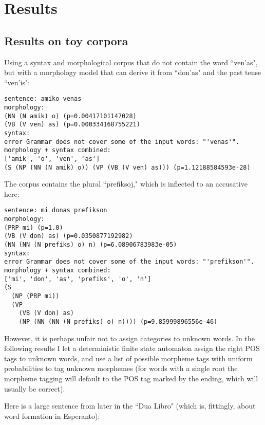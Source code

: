 \documentclass[10pt,a4paper]{article}
\begin{document}
\section{Results}
\subsection{Results on toy corpora}

Using a syntax and morphological corpus that do not contain the word ``ven'as",
but with a morphology model that can derive it from ``don'as" and the past
tense ``ven'is":

\begin{verbatim}
sentence: amiko venas
morphology:
(NN (N amik) o) (p=0.00417101147028)
(VB (V ven) as) (p=0.000334168755221)
syntax:
error Grammar does not cover some of the input words: "'venas'".
morphology + syntax combined:
['amik', 'o', 'ven', 'as']
(S (NP (NN (N amik) o)) (VP (VB (V ven) as))) (p=1.12188584593e-28)
\end{verbatim}

The corpus contains the plural ``prefiksoj," which is inflected to an accusative here:

\begin{verbatim}
sentence: mi donas prefikson
morphology:
(PRP mi) (p=1.0)
(VB (V don) as) (p=0.0350877192982)
(NN (NN (N prefiks) o) n) (p=6.08906783983e-05)
syntax:
error Grammar does not cover some of the input words: "'prefikson'".
morphology + syntax combined:
['mi', 'don', 'as', 'prefiks', 'o', 'n']
(S
  (NP (PRP mi))
  (VP
    (VB (V don) as)
    (NP (NN (NN (N prefiks) o) n)))) (p=9.85999896556e-46)
\end{verbatim}

However, it is perhaps unfair not to assign categories to unknown words. 
In the following results I let a deterministic finite state automaton
assign the right POS tags to unknown words, and use a list of possible
morpheme tags with uniform probabilities to tag unknown morphemes (for words
with a single root the morpheme tagging will default to the POS tag marked
by the ending, which will usually be correct).

Here is a large sentence from later in the ``Dua Libro" (which is, fittingly,
about word formation in Esperanto):
\end{document}
